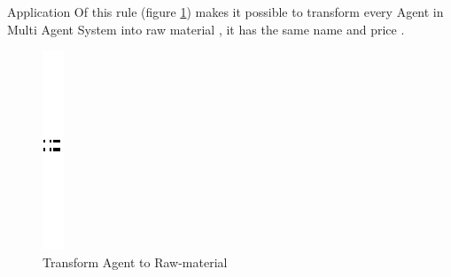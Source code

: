  
Application Of this rule (figure \ref{fig:Generate for each agent raw material}) 
makes it possible to transform  every Agent in Multi Agent System into raw material , it has the same name and price  .
\vspace{1cm}
\begin{figure}[th]

\centering

\quad{}
\includegraphics{Chapiter3/img/sep}
\quad{}
 
 
\caption{\label{fig:Generate for each agent raw material}Transform Agent to Raw-material} 
\end{figure}
\vspace{1cm}


